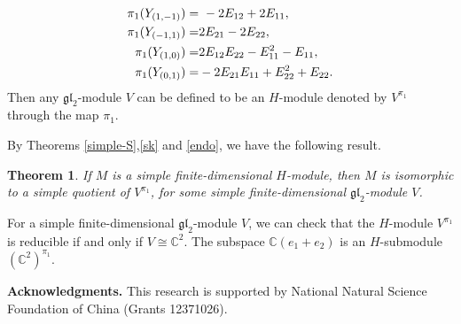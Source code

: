 \documentclass[12pt,a4paper]{amsart}
\newtheorem{Theorem}{Theorem}[section]
\def\C{\mathbb{C}}
\def\gl{\mathfrak{gl}}
\begin{document}
 \begin{equation}
 \aligned  \pi_1(Y_{(1,-1)})= &\  -2E_{12}+2E_{11} ,\\
 \pi_1(Y_{(-1,1)})= &2E_{21}-2E_{22} ,\\
 \pi_1(Y_{(1,0)})=&2E_{12}E_{22}-E_{11}^2-E_{11}, \\
 \pi_1(Y_{(0,1)})=&-2E_{21}E_{11}+E_{22}^2+E_{22}. \endaligned\end{equation}
 Then any $\gl_2$-module $V$ can be defined to be an $H$-module denoted by $V^{\pi_1}$ through the map $\pi_1$.

 By Theorems \ref{simple-S},\ref{sk} and \ref{endo}, we have the following result.

\begin{Theorem}\label{H-mod}
If $M$ is a simple finite-dimensional $H$-module, then $M$ is isomorphic to
a simple quotient of $V^{\pi_1}$, for some simple finite-dimensional $\gl_2$-module $V$.
\end{Theorem}

For a simple finite-dimensional $\gl_2$-module $V$, we can check that the $H$-module $V^{\pi_1}$ is reducible if and only if
$V\cong \C^2$. The subspace $\C(e_1+e_2)$ is an  $H$-submodule $(\C^2)^{\pi_1}$.

\vspace{2mm}

\noindent
{\bf Acknowledgments. }This research is supported  by National Natural Science Foundation of China (Grants
12371026).
\end{document}
